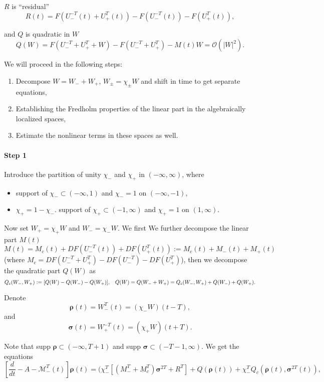 \documentclass[letterpaper,11pt]{article}
\newcommand{\rmO}{\mathcal{O}}
\newcommand{\Rho}{\bm{\rho}}
\newcommand{\bigma}{\bm{\sigma}}
\numberwithin{equation}{section}
\theoremstyle{plain}
\begin{document}
$R$ is ``residual''
\[
R(t) = F(U_-^{-T}(t)+U_+^T(t)) - F(U_-^{-T}(t)) -F(U_+^T(t)), 
\]

and $Q$ is quadratic in $W$
\[
Q(W) = F(U_-^{-T}+U_+^T + W)-F(U_-^{-T}+U_+^T)-M(t)W = \rmO(|W|^2).
\]

We will proceed in the following steps:

\begin{enumerate}
\item Decompose $W = W_-+W_+$, $W_\pm = \chi_\pm W$ and shift in time to get separate equations,

\item Establishing the Fredholm properties of the linear part in the algebraically localized spaces,

\item Estimate the nonlinear terms in these spaces as well.
\end{enumerate} 

\paragraph{Step 1}
Introduce the partition of unity $\chi_-$ and $\chi_+$ in $(-\infty, \infty)$, where  
\begin{itemize}
\item  support of $\chi_- \subset (-\infty,1)$ and $\chi_- = 1$ on $(-\infty,-1)$,
\item $\chi_+=1-\chi_-$. support of $\chi_+ \subset (-1,\infty)$ and $\chi_+ = 1$ on $(1,\infty)$.
\end{itemize}


Now set $W_+ = \chi_+W$ and $W_-=\chi_-W$. We first 
We further decompose the linear part $M(t)$
\[
M(t)  = M_c(t) + DF(U_-^{-T}(t))+DF(U_+^T(t)):=M_c(t)+M_-(t)+M_+(t)
\]
(where $M_c = DF(U_-^{-T}+U_+^T)-DF(U_-^{-T})-DF(U_+^T)$), then we decompose the quadratic part $Q(W)$ as
\[
Q_c(W_-,W_+) := [Q(W)-Q(W_-)-Q(W_+)], \hspace{0.3cm} Q(W) = Q(W_-+W_+)= Q_c(W_-,W_+)+ Q(W_-)+Q(W_+) .
\]


Denote 
\[
\Rho(t) = W_-^T(t)  = (\chi_-W)(t-T),
\]
 and 
 \[
 \bigma(t) = W_+^{-T}(t) = (\chi_+W)(t+T). 
 \]
 
Note that supp $\Rho \subset (-\infty, T+1)$ and supp $\bigma \subset (-T-1,\infty)$.
 We get the equations 
\begin{equation}\label{center}
\left[\frac{d}{dt}-A-\mathcal{M}_-^T(t) \right]\bm{\rho}(t)  = (\chi_-^T[(M_-^T+M_c^T)\bigma^{2T}+R^T] + Q(\bm{\rho}(t))+\chi_-^TQ_c(\bm{\rho}(t),\bm{\sigma}^{2T}(t)),
\end{equation}
\end{document}
